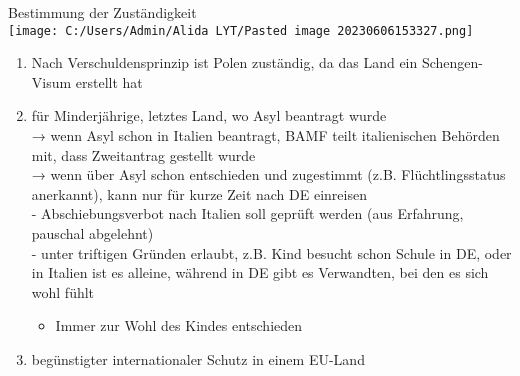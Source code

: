 \documentclass[
]{article}
\providecommand{\tightlist}{%
  \setlength{\itemsep}{0pt}\setlength{\parskip}{0pt}}
\begin{document}
Bestimmung der Zuständigkeit\\
\texttt{[image: C:/Users/Admin/Alida LYT/Pasted image 20230606153327.png]}

\begin{enumerate}
\tightlist
\item
  Nach Verschuldensprinzip ist Polen zuständig, da das Land ein
  Schengen-Visum erstellt hat
\item
  für Minderjährige, letztes Land, wo Asyl beantragt wurde\\
  → wenn Asyl schon in Italien beantragt, BAMF teilt italienischen
  Behörden mit, dass Zweitantrag gestellt wurde\\
  → wenn über Asyl schon entschieden und zugestimmt (z.B.
  Flüchtlingsstatus anerkannt), kann nur für kurze Zeit nach DE
  einreisen\\
  - Abschiebungsverbot nach Italien soll geprüft werden (aus Erfahrung,
  pauschal abgelehnt)\\
  - unter triftigen Gründen erlaubt, z.B. Kind besucht schon Schule in
  DE, oder in Italien ist es alleine, während in DE gibt es Verwandten,
  bei den es sich wohl fühlt

  \begin{itemize}
  \tightlist
  \item
    Immer zur Wohl des Kindes entschieden
  \end{itemize}
\item
  begünstigter internationaler Schutz in einem EU-Land
\end{enumerate}
\end{document}
